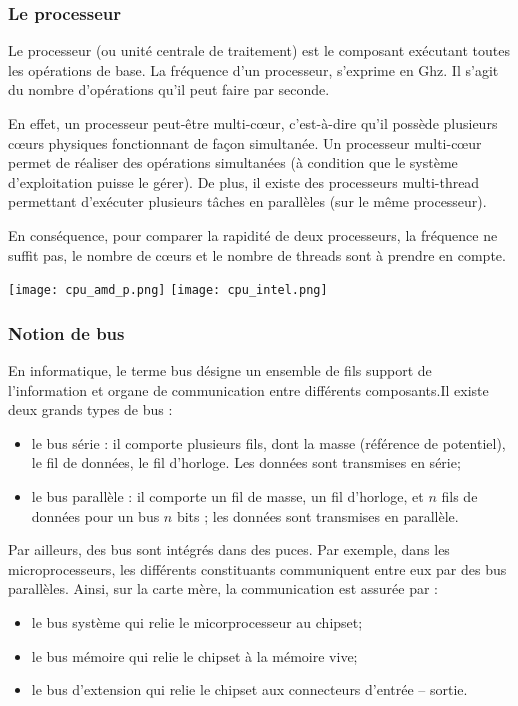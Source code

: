 \subsubsection{Le processeur}
\begin{minipage}[c]{.65\linewidth}
Le processeur (ou unité centrale de traitement) est le composant exécutant toutes les opérations de base. La fréquence d'un processeur, s'exprime en Ghz. Il s'agit du nombre d'opérations qu'il peut faire par seconde.

En effet, un processeur peut-être multi-c\oe{}ur, c'est-à-dire qu'il possède plusieurs c\oe{}urs physiques fonctionnant de façon simultanée. Un processeur multi-c\oe{}ur permet de réaliser des opérations simultanées (à condition que le système d'exploitation puisse le gérer). 
De plus, il existe des processeurs multi-thread permettant d'exécuter plusieurs tâches en parallèles (sur le même processeur). 

En conséquence, pour comparer la rapidité de deux processeurs, la fréquence ne suffit pas, le nombre de cœurs et le nombre de threads sont à prendre en compte. 

\end{minipage}\hfill
\begin{minipage}[c]{.3\linewidth}
\begin{center}
\texttt{[image: cpu\_amd\_p.png]}
\texttt{[image: cpu\_intel.png]}
\end{center}
\end{minipage}
\subsubsection{Notion de bus}
En informatique, le terme bus désigne un ensemble de fils support de l'information et organe de communication entre différents composants.Il existe deux grands types de bus :
\begin{itemize}
\item le bus série : il comporte plusieurs fils, dont la masse (référence de potentiel), le fil de données, le fil d'horloge. Les données sont transmises en série;
\item le bus parallèle : il comporte un fil de masse, un fil d'horloge, et $n$ fils de données pour un bus $n$ bits ; les données sont transmises en parallèle.
\end{itemize}

Par ailleurs, des bus sont intégrés dans des puces. Par exemple, dans les microprocesseurs, les différents constituants communiquent entre eux par des bus parallèles. Ainsi, sur la carte mère, la communication est assurée par :
\begin{itemize}
\item le bus système qui relie le micorprocesseur au chipset;
\item le bus mémoire qui relie le chipset à la mémoire vive;
\item le bus d'extension qui relie le chipset aux connecteurs d'entrée -- sortie.
\end{itemize}

